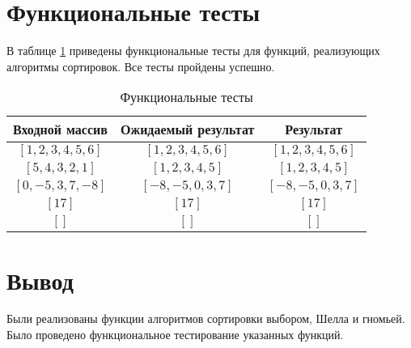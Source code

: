 \section{Функциональные тесты}

В таблице \ref{tbl:func-tests} приведены функциональные тесты для функций, реализующих алгоритмы сортировок. Все тесты пройдены успешно.

\begin{table}[h]
	\begin{center}
		\caption{\label{tbl:func-tests} Функциональные тесты}
		\begin{tabular}{|c|c|c|}
			\hline
			Входной массив & Ожидаемый результат & Результат \\ 
			\hline
			$[1, 2, 3, 4, 5, 6]$ & $[1, 2, 3, 4, 5, 6]$  & $[1, 2, 3, 4, 5, 6]$\\
			$[5, 4, 3, 2, 1]$  & $[1, 2, 3, 4, 5]$ & $[1, 2, 3, 4, 5]$\\
			$[0, -5, 3, 7, -8]$  & $[-8, -5, 0, 3, 7]$  & $[-8, -5, 0, 3, 7]$\\
			$[17]$  & $[17]$  & $[17]$\\
			$[]$  & $[]$  & $[]$\\
			\hline
		\end{tabular}
	\end{center}
\end{table}

\section*{Вывод}

Были реализованы функции алгоритмов сортировки выбором, Шелла и гномьей. Было проведено функциональное тестирование указанных функций.